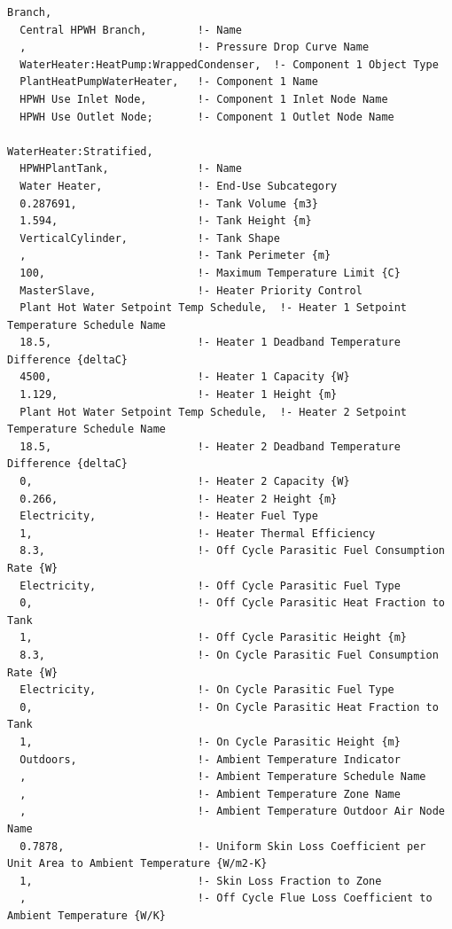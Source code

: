 \begin{lstlisting}
Branch,
  Central HPWH Branch,        !- Name
  ,                           !- Pressure Drop Curve Name
  WaterHeater:HeatPump:WrappedCondenser,  !- Component 1 Object Type
  PlantHeatPumpWaterHeater,   !- Component 1 Name
  HPWH Use Inlet Node,        !- Component 1 Inlet Node Name
  HPWH Use Outlet Node;       !- Component 1 Outlet Node Name

WaterHeater:Stratified,
  HPWHPlantTank,              !- Name
  Water Heater,               !- End-Use Subcategory
  0.287691,                   !- Tank Volume {m3}
  1.594,                      !- Tank Height {m}
  VerticalCylinder,           !- Tank Shape
  ,                           !- Tank Perimeter {m}
  100,                        !- Maximum Temperature Limit {C}
  MasterSlave,                !- Heater Priority Control
  Plant Hot Water Setpoint Temp Schedule,  !- Heater 1 Setpoint Temperature Schedule Name
  18.5,                       !- Heater 1 Deadband Temperature Difference {deltaC}
  4500,                       !- Heater 1 Capacity {W}
  1.129,                      !- Heater 1 Height {m}
  Plant Hot Water Setpoint Temp Schedule,  !- Heater 2 Setpoint Temperature Schedule Name
  18.5,                       !- Heater 2 Deadband Temperature Difference {deltaC}
  0,                          !- Heater 2 Capacity {W}
  0.266,                      !- Heater 2 Height {m}
  Electricity,                !- Heater Fuel Type
  1,                          !- Heater Thermal Efficiency
  8.3,                        !- Off Cycle Parasitic Fuel Consumption Rate {W}
  Electricity,                !- Off Cycle Parasitic Fuel Type
  0,                          !- Off Cycle Parasitic Heat Fraction to Tank
  1,                          !- Off Cycle Parasitic Height {m}
  8.3,                        !- On Cycle Parasitic Fuel Consumption Rate {W}
  Electricity,                !- On Cycle Parasitic Fuel Type
  0,                          !- On Cycle Parasitic Heat Fraction to Tank
  1,                          !- On Cycle Parasitic Height {m}
  Outdoors,                   !- Ambient Temperature Indicator
  ,                           !- Ambient Temperature Schedule Name
  ,                           !- Ambient Temperature Zone Name
  ,                           !- Ambient Temperature Outdoor Air Node Name
  0.7878,                     !- Uniform Skin Loss Coefficient per Unit Area to Ambient Temperature {W/m2-K}
  1,                          !- Skin Loss Fraction to Zone
  ,                           !- Off Cycle Flue Loss Coefficient to Ambient Temperature {W/K}

\end{lstlisting}
